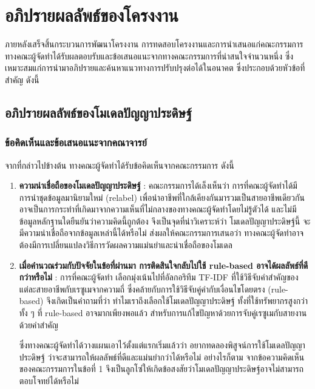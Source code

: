\chapter{อภิปรายผลลัพธ์ของโครงงาน}

\par{
    ภายหลังเสร็จสิ้นกระบวนการพัฒนาโครงงาน การทดสอบโครงงานและการนำเสนอแก่คณะกรรมการ ทางคณะผู้จัดทำได้รับผลตอบรับและข้อเสนอแนะจากทางคณะกรรมการที่น่าสนใจจำนวนหนึ่ง ซึ่งเหมาะสมแก่การนำมาอภิปรายและค้นหาแนวทางการปรับปรุงต่อได้ในอนาคต ซึ่งประกอบด้วยหัวข้อที่สำคัญ ดังนี้
}

\section{อภิปรายผลลัพธ์ของโมเดลปัญญาประดิษฐ์}
\subsection{ข้อคิดเห็นและข้อเสนอแนะจากคณาจารย์}
จากที่กล่าวไปข้างต้น ทางคณะผู้จัดทำได้รับข้อคิดเห็นจากคณะกรรมการ ดังนี้

\begin{enumerate}
    \item \textbf{ความน่าเชื่อถือของโมเดลปัญญาประดิษฐ์} : คณะกรรมการได้เล็งเห็นว่า การที่คณะผู้จัดทำได้มีการนำชุดข้อมูลมานิยามใหม่ (relabel) เพื่อนำอาชีพที่ใกล้เคียงกันมารวมเป็นสายอาชีพเดียวกัน อาจเป็นการกระทำที่เกิดมาจากความเห็นที่ไม่กลางของทางคณะผู้จัดทำโดยไม่รู้ตัวได้ และไม่มีข้อมูลหลักฐานใดยืนยันว่าความคิดนี้ถูกต้อง จึงเป็นจุดที่น่าวิเคราะห์ว่า โมเดลปัญญาประดิษฐ์นี้ จะมีความน่าเชื่อถือจากข้อมูลเหล่านี้ได้หรือไม่ ส่งผลให้คณะกรรมการเสนอว่า ทางคณะผู้จัดทำอาจต้องมีการเปลี่ยนแปลงวิธีการวัดผลความแม่นยำและน่าเชื่อถือของโมเดล
    \item \textbf{เมื่อคำนวณร่วมกับปัจจัยในข้อที่ผ่านมา การติดสินใจกลับไปใช้ rule-based อาจได้ผลลัพธ์ที่ดีกว่าหรือไม่} : 
    การที่คณะผู้จัดทำ เลือกมุ่งเน้นไปที่อัลกอริทึม TF-IDF ที่ใช้วิธีจับคำสำคัญของแต่ละสายอาชีพกับเรซูเมจากความถี่ ซึ่งคล้ายกับการใช้วิธีจับคู่คำกับเงื่อนไขโดยตรง (rule-based) จึงเกิดเป็นคำถามที่ว่า ทำไมเราถึงเลือกใช้โมเดลปัญญาประดิษฐ์ ทั้งที่ใช้ทรัพยากรสูงกว่า ทั้ง ๆ ที่ rule-based อาจมากเพียงพอแล้ว สำหรับการแก้ไขปัญหาด้วยการจับคู่เรซูเมกับสายงานด้วยคำสำคัญ
    
    ซึ่งทางคณะผู้จัดทำได้วางแผนเอาไว้ตั้งแต่แรกเริ่มแล้วว่า อยากทดลองพิสูจน์การใช้โมเดลปัญญาประดิษฐ์ ว่าจะสามารถให้ผลลัพธ์ที่ดีและแม่นยำกว่าได้หรือไม่ อย่างไรก็ตาม จากข้อความคิดเห็นของคณะกรรมการในข้อที่ 1 จึงเป็นลูกโซ่ให้เกิดข้อสงสัยว่าโมเดลปัญญาประดิษฐ์อาจไม่สามารถตอบโจทย์ได้หรือไม่
    
\end{enumerate}

